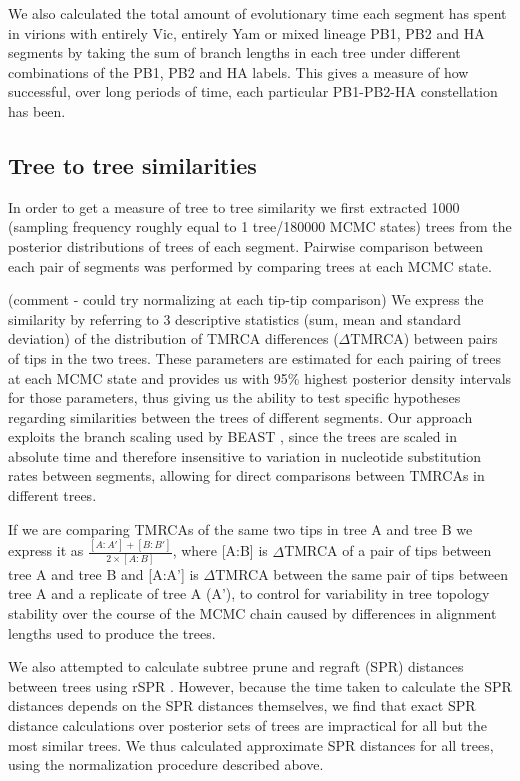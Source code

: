 \documentclass[11pt,oneside,letterpaper]{article}
\begin{document}
We also calculated the total amount of evolutionary time each segment has spent in virions with entirely Vic, entirely Yam or mixed lineage PB1, PB2 and HA segments by taking the sum of branch lengths in each tree under different combinations of the PB1, PB2 and HA labels.
This gives a measure of how successful, over long periods of time, each particular PB1-PB2-HA constellation has been.

\subsection*{Tree to tree similarities}
In order to get a measure of tree to tree similarity we first extracted 1000 (sampling frequency roughly equal to 1 tree/180000 MCMC states) trees from the posterior distributions of trees of each segment.
Pairwise comparison between each pair of segments was performed by comparing trees at each MCMC state.

(comment - could try normalizing at each tip-tip comparison)
We express the similarity by referring to 3 descriptive statistics (sum, mean and standard deviation) of the distribution of TMRCA differences ($\Delta$TMRCA) between pairs of tips in the two trees.
These parameters are estimated for each pairing of trees at each MCMC state and provides us with 95\% highest posterior density intervals for those parameters, thus giving us the ability to test specific hypotheses regarding similarities between the trees of different segments.
Our approach exploits the branch scaling used by BEAST \cite{drummond2012}, since the trees are scaled in absolute time and therefore insensitive to variation in nucleotide substitution rates between segments, allowing for direct comparisons between TMRCAs in different trees.

If we are comparing TMRCAs of the same two tips in tree A and tree B we express it as $\frac{[A:A']+[B:B']}{2\times [A:B]}$, where [A:B] is $\Delta$TMRCA of a pair of tips between tree A and tree B and [A:A'] is $\Delta$TMRCA between the same pair of tips between tree A and a replicate of tree A (A'), to control for variability in tree topology stability over the course of the MCMC chain caused by differences in alignment lengths used to produce the trees.

We also attempted to calculate subtree prune and regraft (SPR) distances between trees using rSPR \cite{whidden2009,whidden2010,whidden2013}.
However, because the time taken to calculate the SPR distances depends on the SPR distances themselves, we find that exact SPR distance calculations over posterior sets of trees are impractical for all but the most similar trees.
We thus calculated approximate SPR distances for all trees, using the normalization procedure described above.
\end{document}
